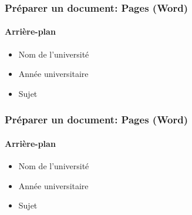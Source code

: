 \documentclass[xcolor=table]{beamer}
\begin{document}
\begin{frame}[t]
\frametitle{Préparer un document: Pages (Word)}
\framesubtitle{Arrière-plan}

\begin{minipage}{0.43\textwidth}
	\begin{itemize}
		\item Nom de l'université 
		\item Année universitaire
		\item Sujet
	\end{itemize}
\end{minipage}
\begin{minipage}{0.55\textwidth}
\end{minipage}

\end{frame}

\begin{frame}[t]
\frametitle{Préparer un document: Pages (Word)}
\framesubtitle{Arrière-plan}

\begin{minipage}{0.43\textwidth}
	\begin{itemize}
		\item Nom de l'université 
		\item Année universitaire
		\item Sujet
	\end{itemize}
\end{minipage}
\begin{minipage}{0.55\textwidth}
\end{minipage}

\end{frame}
\end{document}
